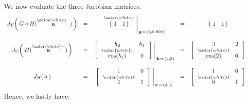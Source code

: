 We now evaluate the three Jacobian matrices:
\begin{equation*}
\begin{array}{ccccc}
J_{F}\!\left(\,G \circ H(\overset{{\color{white}-}}{\mathbf{a}})\,\right)
& = &
	\left.
	\overset{{\color{white}.}}{\left(\!\begin{array}{cc}
		1 & 1
		\end{array}\!\!\right)}
		\;\right\vert_{\,\mathbf{g}\,\approx\,(6,0.909)}
& = &
	\left(\!\begin{array}{cc}
		1 & 1
		\end{array}\!\!\right)
\\
\\
J_{G}\!\left(\,H(\overset{{\color{white}-}}{\mathbf{a}})\,\right)
& = &
	\left.
	\left[\,\begin{array}{cc}
		h_{2} & h_{1}
		\\
		\overset{{\color{white}1}}{\cos(h_{1})} & 0
		\end{array}\,\right]
		\;\right\vert_{\,\mathbf{h}\,=\,(2,3)}
& = &
	\left[\,\begin{array}{cc}
		3 & 2
		\\
		\overset{{\color{white}1}}{\cos(2)} & 0
		\end{array}\,\right]
\\
\\
J_{H}\!\left(\,\mathbf{a}\,\right)
& = &
	\left.
	\left[\,\begin{array}{cc}
		1 & 0
		\\
		\overset{{\color{white}1}}{0} & 1
		\end{array}\,\right]
		\;\right\vert_{\,\mathbf{x}\,=\,(2,3)}
& = &
	\left[\,\begin{array}{cc}
		1 & 0
		\\
		\overset{{\color{white}1}}{0} & 1
		\end{array}\,\right]
\end{array}
\end{equation*}
Hence, we lastly have:
